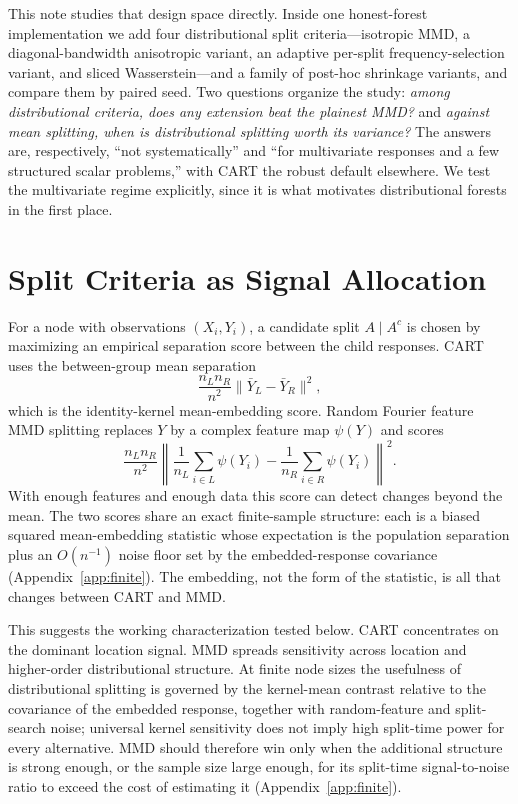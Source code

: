 \documentclass[11pt]{article}
\theoremstyle{remark}
\begin{document}
This note studies that design space directly.  Inside one honest-forest
implementation we add four distributional split criteria---isotropic MMD, a
diagonal-bandwidth anisotropic variant, an adaptive per-split
frequency-selection variant, and sliced Wasserstein---and a family of post-hoc
shrinkage variants, and compare them by paired seed.  Two questions organize the
study: \emph{among distributional criteria, does any extension beat the plainest
MMD?} and \emph{against mean splitting, when is distributional splitting worth
its variance?}  The answers are, respectively, ``not systematically'' and ``for
multivariate responses and a few structured scalar problems,'' with CART the
robust default elsewhere.  We test the multivariate regime explicitly, since it
is what motivates distributional forests in the first place.

\section{Split Criteria as Signal Allocation}

For a node with observations $(X_i,Y_i)$, a candidate split $A \mid A^c$ is
chosen by maximizing an empirical separation score between the child responses.
CART uses the between-group mean separation
\[
  \frac{n_L n_R}{n^2}\|\bar Y_L-\bar Y_R\|^2,
\]
which is the identity-kernel mean-embedding score.  Random Fourier feature MMD
splitting replaces $Y$ by a complex feature map $\psi(Y)$ and scores
\[
  \frac{n_L n_R}{n^2}
  \left\| \frac{1}{n_L}\sum_{i\in L}\psi(Y_i)
        - \frac{1}{n_R}\sum_{i\in R}\psi(Y_i) \right\|^2 .
\]
With enough features and enough data this score can detect changes beyond the
mean.  The two scores share an exact finite-sample structure: each is a biased
squared mean-embedding statistic whose expectation is the population separation
plus an $O(n^{-1})$ noise floor set by the embedded-response covariance
(Appendix~\ref{app:finite}).  The embedding, not the form of the statistic, is
all that changes between CART and MMD.

This suggests the working characterization tested below.  CART concentrates on
the dominant location signal.  MMD spreads sensitivity across location and
higher-order distributional structure.  At finite node sizes the usefulness of
distributional splitting is governed by the kernel-mean contrast relative to the
covariance of the embedded response, together with random-feature and
split-search noise; universal kernel sensitivity does not imply high split-time
power for every alternative.  MMD should therefore win only when the additional
structure is strong enough, or the sample size large enough, for its split-time
signal-to-noise ratio to exceed the cost of estimating it (Appendix~\ref{app:finite}).
\end{document}
